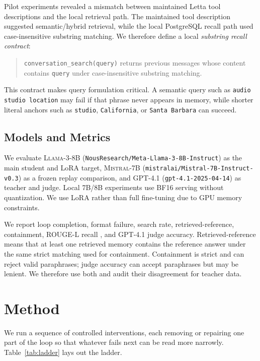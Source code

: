 \documentclass[11pt]{article}
\newcommand{\model}[1]{\textsc{#1}}
\newcommand{\tool}[1]{\texttt{#1}}
\begin{document}
Pilot experiments revealed a mismatch between maintained Letta tool descriptions and the local retrieval path. The maintained tool description suggested semantic/hybrid retrieval, while the local PostgreSQL recall path used case-insensitive substring matching. We therefore define a local \emph{substring recall contract}:
\begin{quote}\small
\tool{conversation\_search(query)} returns previous messages whose content contains \tool{query} under case-insensitive substring matching.
\end{quote}
This contract makes query formulation critical. A semantic query such as \tool{audio studio location} may fail if that phrase never appears in memory, while shorter literal anchors such as \tool{studio}, \tool{California}, or \tool{Santa Barbara} can succeed.

\subsection{Models and Metrics}

We evaluate \model{Llama-3-8B} \citep{grattafiori2024llama3} (\tool{NousResearch/Meta-Llama-3-8B-Instruct}) as the main student and LoRA target, \model{Mistral-7B} \citep{jiang2023mistral} (\tool{mistralai/Mistral-7B-Instruct-v0.3}) as a frozen replay comparison, and \model{GPT-4.1} (\tool{gpt-4.1-2025-04-14}) as teacher and judge. Local 7B/8B experiments use BF16 serving without quantization. We use LoRA rather than full fine-tuning due to GPU memory constraints.

We report loop completion, format failure, search rate, retrieved-reference, containment, ROUGE-L recall \citep{lin2004rouge}, and GPT-4.1 judge accuracy. Retrieved-reference means that at least one retrieved memory contains the reference answer under the same strict matching used for containment. Containment is strict and can reject valid paraphrases; judge accuracy can accept paraphrases but may be lenient. We therefore use both and audit their disagreement for teacher data.

\section{Method}

We run a sequence of controlled interventions, each removing or repairing one part of the loop so that whatever fails next can be read more narrowly. Table~\ref{tab:ladder} lays out the ladder.
\end{document}
